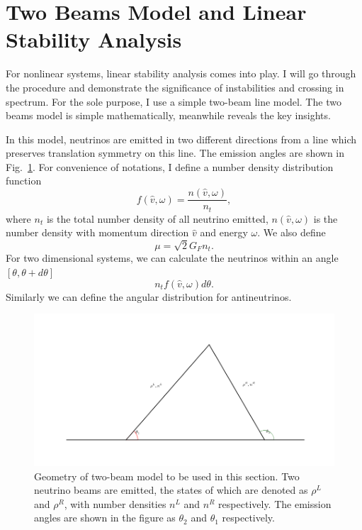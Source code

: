 \section{\label{chap:dr-sec:two-beams}Two Beams Model and Linear Stability Analysis}

For nonlinear systems, linear stability analysis comes into play. I will go through the procedure and demonstrate the significance of instabilities and crossing in spectrum. For the sole purpose, I use a simple two-beam line model. The two beams model is simple mathematically, meanwhile reveals the key insights.

In this model, neutrinos are emitted in two different directions from a line which preserves translation symmetry on this line. The emission angles are shown in Fig.~\ref{chap:dr-sec:two-beams-fig:two-beam-line-model}. For convenience of notations, I define a number density distribution function
\begin{equation}
   f(\hat v,\omega)= \frac{n(\hat v,\omega)}{n_t},
\end{equation}
where $n_t$ is the total number density of all neutrino emitted, $n(\hat v,\omega)$ is the number density with momentum direction $\hat v$ and energy $\omega$.
We also define
\begin{equation}
   \mu = \sqrt{2}G_F n_t.
\end{equation}
For two dimensional systems, we can calculate the neutrinos within an angle $[\theta,\theta+d\theta]$
\begin{equation}
   n_t f(\hat v,\omega) d\theta.
\end{equation}
Similarly we can define the angular distribution for antineutrinos.


\begin{figure}[!htbp]
    \centering
    \includegraphics[width=\textwidth]{chapters/assets/dr/two-beam-line-model.png}
    \caption{Geometry of two-beam model to be used in this section. Two neutrino beams are emitted, the states of which are denoted as $\rho^L$ and $\rho^R$, with number densities $n^L$ and $n^R$ respectively. The emission angles are shown in the figure as $\theta_2$ and $\theta_1$ respectively. }
    \label{chap:dr-sec:two-beams-fig:two-beam-line-model}
\end{figure}



